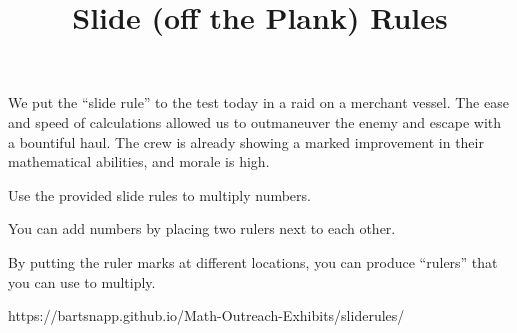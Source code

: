 \documentclass{../exhibit}
\title{Slide (off the Plank) Rules}
\begin{document}
\begin{context} We put the ``slide rule'' to the test today in a raid on a
merchant vessel. The ease and speed of calculations allowed us to
outmaneuver the enemy and escape with a bountiful haul. The crew is
already showing a marked improvement in their mathematical abilities,
and morale is high.
\end{context}

\begin{directions}
  Use the provided slide rules to multiply numbers.
\end{directions}

\begin{example}
You can add numbers by placing two rulers next to each other.
  \begin{center}
\end{center}
By putting the ruler marks at different locations, you can produce ``rulers'' that you can use to multiply.
  \begin{center}
\end{center}
\end{example}

\begin{mathConnections}
  https://bartsnapp.github.io/Math-Outreach-Exhibits/sliderules/
\end{mathConnections}
\end{document}
